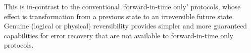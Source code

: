 \documentclass[HFT-main.tex]{subfiles}
\begin{document}
This is in-contrast to the conventional `forward-in-time only' protocols, whose effect is transformation from a previous state to an irreversible future state. Genuine (logical or physical) reversibility provides simpler and more guaranteed capabilities for error recovery that are not available to forward-in-time only protocols.
\end{document}
